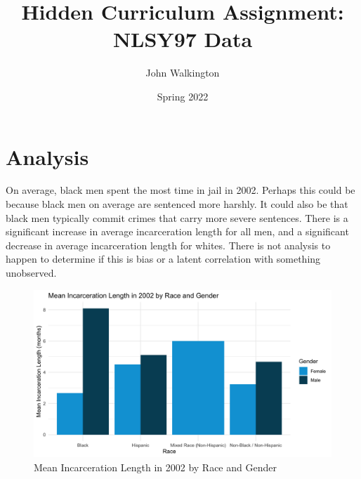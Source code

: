 \documentclass{article}
\author{John Walkington}
\title{Hidden Curriculum Assignment: NLSY97 Data}
\date{Spring 2022}
\begin{document}
\maketitle

\section{Analysis}

On average, black men spent the most time in jail in 2002.  Perhaps this could be because black men on average are sentenced more harshly.  It could also be that black men typically commit crimes that carry more severe sentences.  There is a significant increase in average incarceration length for all men, and a significant decrease in average incarceration length for whites.  There is not analysis to happen to determine if this is bias or a latent correlation with something unobserved.

\begin{figure}[H]
    \begin{center}
        \includegraphics[width=.85\textwidth]{incarc_length_by_racegender}
    \end{center}
    \caption{Mean Incarceration Length in 2002 by Race and Gender}
    \label{fig:graph}
\end{figure}






\end{document}
